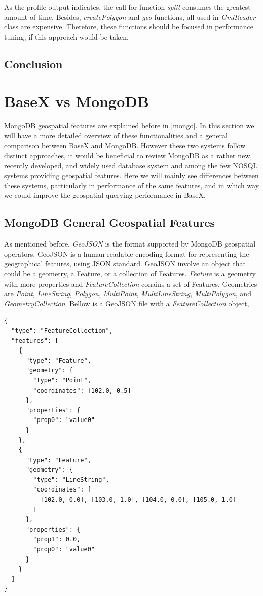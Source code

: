 \documentclass[a4paper,12pt]{article}
\begin{document}
As the profile output indicates, the call for function \textit{split} consumes the greatest amount of time. Besides, \textit{createPolygon} and \textit{geo} functions, all used in \textit{GmlReader} class are expensive. Therefore, these functions should be focused in performance tuning, if this approach would be taken.

\subsection{Conclusion}


\newpage
\section{BaseX vs MongoDB}
\label{s.mongo}

MongoDB geospatial features are explained before in \ref{mongo}. In this section we will have a more detailed overview of these functionalities and a general comparison between BaseX and MongoDB. However these two systems follow distinct approaches, it would be beneficial to review MongoDB as a rather new, recently developed, and widely used database system and among the few NOSQL systems providing geospatial features. Here we will mainly see differences between these systems, particularly in performance of the same features, and in which way we could improve the geospatial querying performance in BaseX. 


\subsection {MongoDB General Geospatial Features}
As mentioned before, \textit{GeoJSON} is the format supported by MongoDB geospatial operators. GeoJSON is a human-readable encoding format for representing the geographical features, using JSON standard. GeoJSON involve an object that could be a geometry, a Feature, or a collection of Features. \textit{Feature} is a geometry with more properties and \textit{FeatureCollection} conains a set of Features. Geometries are \textit{Point}, \textit{LineString}, \textit{Polygon}, \textit{MultiPoint}, \textit{MultiLineString}, \textit{MultiPolygon}, and \textit{GeometryCollection}. Bellow is a GeoJSON file with a \textit{FeatureCollection} object,

\begin{verbatim}
{
  "type": "FeatureCollection",
  "features": [
    {
      "type": "Feature",
      "geometry": {
        "type": "Point",
        "coordinates": [102.0, 0.5]
      },
      "properties": {
        "prop0": "value0"
      }
    },
    {
      "type": "Feature",
      "geometry": {
        "type": "LineString",
        "coordinates": [
          [102.0, 0.0], [103.0, 1.0], [104.0, 0.0], [105.0, 1.0]
        ]
      },
      "properties": {
        "prop1": 0.0,
        "prop0": "value0"
      }
    }
  ]
}
\end{verbatim}
\end{document}

